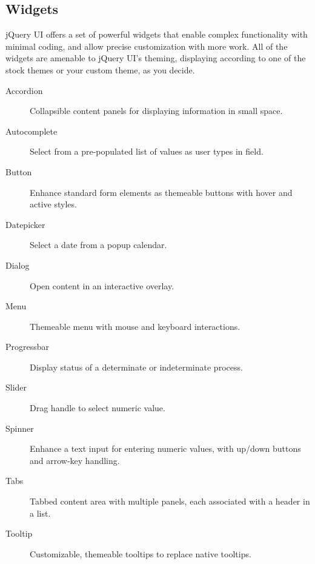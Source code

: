 \documentclass[11pt,a4paper]{article}
\begin{document}
\subsection*{Widgets}
jQuery UI offers a set of powerful widgets that enable complex functionality with minimal coding, and allow precise customization with more work. All of the widgets are amenable to jQuery UI’s theming, displaying according to one of the stock themes or your custom theme, as you decide.
\begin{description}
 \item [Accordion] Collapsible content panels for displaying information in small space.
\item [Autocomplete] Select from a pre-populated list of values as user types in field.
\item [Button] Enhance standard form elements as themeable buttons with hover and active styles.
\item [Datepicker] Select a date from a popup calendar.
\item [Dialog] Open content in an interactive overlay.
\item [Menu] Themeable menu with mouse and keyboard interactions.
\item [Progressbar] Display status of a determinate or indeterminate process.
\item [Slider] Drag handle to select numeric value.
\item [Spinner] Enhance a text input for entering numeric values, with up/down buttons and arrow-key handling.
\item [Tabs] Tabbed content area with multiple panels, each associated with a header in a list.
\item [Tooltip] Customizable, themeable tooltips to replace native tooltips.
\end{description}
\end{document}
